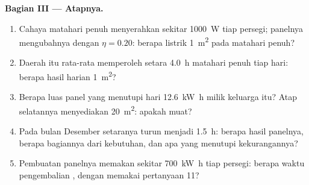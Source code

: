 \begin{problem}
\medskip
\noindent\textbf{Bagian III --- Atapnya.}
\begin{enumerate}[resume]
  \item Cahaya matahari penuh menyerahkan sekitar \qty{1000}{W} tiap
         persegi; panelnya mengubahnya dengan $\eta = 0.20$:
        berapa  listrik \qty{1}{m^2} pada matahari penuh?
  \item Daerah itu rata-rata memperoleh setara \qty{4.0}{h} matahari
        penuh tiap hari: berapa hasil harian \qty{1}{m^2}?
  \item Berapa luas panel yang menutupi hari \qty{12.6}{kW.h} milik
        keluarga itu? Atap selatannya menyediakan \qty{20}{m^2}: apakah
        muat?
  \item Pada bulan Desember setaranya turun menjadi \qty{1.5}{h}:
        berapa hasil panelnya, berapa bagiannya dari kebutuhan, dan apa
        yang menutupi kekurangannya?
  \item Pembuatan panelnya memakan sekitar \qty{700}{kW.h} tiap 
        persegi: berapa waktu pengembalian , dengan memakai
        pertanyaan 11?
\end{enumerate}


\end{problem}
